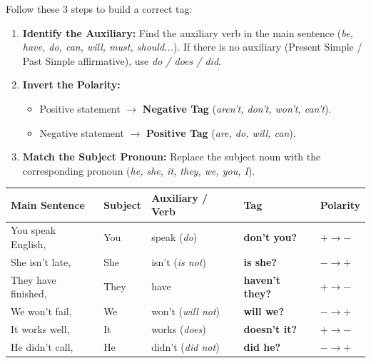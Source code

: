 \documentclass[11pt]{article}
\begin{document}
\begin{methode}
Follow these 3 steps to build a correct tag:
\begin{enumerate}
    \item \textbf{Identify the Auxiliary:} Find the auxiliary verb in the main sentence (\emph{be, have, do, can, will, must, should...}). If there is no auxiliary (Present Simple / Past Simple affirmative), use \emph{do / does / did}.
    \item \textbf{Invert the Polarity:}
        \begin{itemize}
            \item Positive statement $\rightarrow$ \textbf{Negative Tag} (\emph{aren't, don't, won't, can't}).
            \item Negative statement $\rightarrow$ \textbf{Positive Tag} (\emph{are, do, will, can}).
        \end{itemize}
    \item \textbf{Match the Subject Pronoun:} Replace the subject noun with the corresponding pronoun (\emph{he, she, it, they, we, you, I}).
\end{enumerate}
\end{methode}

\begin{center}
\begin{tabular}{|l|l|l|l|l|}\hline
\rowcolor{popblueL}\textbf{Main Sentence} & \textbf{Subject} & \textbf{Auxiliary / Verb} & \textbf{Tag} & \textbf{Polarity} \\ \hline
You speak English, & You & speak (\emph{do}) & \textbf{don't you?} & $+ \rightarrow -$ \\ \hline
She isn't late, & She & isn't (\emph{is not}) & \textbf{is she?} & $- \rightarrow +$ \\ \hline
They have finished, & They & have & \textbf{haven't they?} & $+ \rightarrow -$ \\ \hline
We won't fail, & We & won't (\emph{will not}) & \textbf{will we?} & $- \rightarrow +$ \\ \hline
It works well, & It & works (\emph{does}) & \textbf{doesn't it?} & $+ \rightarrow -$ \\ \hline
He didn't call, & He & didn't (\emph{did not}) & \textbf{did he?} & $- \rightarrow +$ \\ \hline
\end{tabular}
\end{center}
\end{document}
